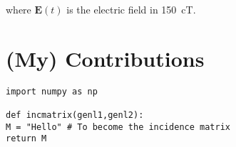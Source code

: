 \documentclass[../main.tex]{subfiles}
\begin{document}
where $\textbf{E}(t)$ is the electric field in \SI{150}{\centi \tesla}.


\section{(My) Contributions}

\lstset{style=python}
\begin{lstlisting}[caption=Hello]
import numpy as np

def incmatrix(genl1,genl2):
M = "Hello" # To become the incidence matrix
return M
\end{lstlisting}
\end{document}
